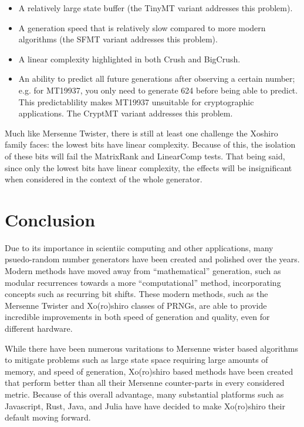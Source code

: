 \documentclass{article}
\begin{document}
        \begin{itemize}
            \item A relatively large state buffer (the TinyMT variant addresses this problem\cite{TinyMT}).
            \item A generation speed that is relatively slow compared to more modern algorithms (the SFMT variant addresses this problem\cite{SFMT}).
            \item A linear complexity highlighted in both Crush and BigCrush\cite{TestU01}.
            \item An ability to predict all future generations after observing a certain number; e.g. for MT19937, you only need to generate 624 before being able to predict.  This predictablility makes MT19937 unsuitable for cryptographic applications.  The CryptMT variant addresses this problem\cite{CryptMT}.
        \end{itemize}

        Much like Mersenne Twister, there is still at least one challenge the Xoshiro family faces: the lowest bits have linear complexity.  Because of this, the isolation of these bits will fail the MatrixRank and LinearComp tests\cite{LowComp, TestU01}.  That being said, since only the lowest bits have linear complexity, the effects will be insignificant when considered in the context of the whole generator\cite{LowComp}.

\pagebreak

    \section*{Conclusion}

        Due to its importance in scientiic computing and other applications, many psuedo-random number generators have been created and polished over the years.  Modern methods have moved away from ``mathematical'' generation, such as modular recurrences towards a more ``computational'' method, incorporating concepts such as recurring bit shifts.  These modern methods, such as the Mersenne Twister and Xo(ro)shiro classes of PRNGs, are able to provide incredible improvements in both speed of generation and quality, even for different hardware.  
        
        While there have been numerous varitations to Mersenne wister based algorithms to mitigate problems such as large state space requiring large amounts of memory, and speed of generation, Xo(ro)shiro based methods have been created that perform better than all their Mersenne counter-parts in every considered metric.  Because of this overall advantage, many substantial platforms such as  Javascript, Rust, Java, and Julia have have decided to make Xo(ro)shiro their default moving forward.
    
    \printbibliography
\end{document}
